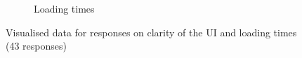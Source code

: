 \documentclass[12pt]{ociamthesis}  %
\begin{document}
\begin{figure}[H]
\begin{subfigure}[b]{.5\textwidth}
  \caption{Loading times}
  \label{}
\end{subfigure}
\caption[Visualised data for responses on clarity of the UI and loading times]{Visualised data for responses on clarity of the UI and loading times (43 responses)}
\label{fig:chart1}
\end{figure}
\end{document}

